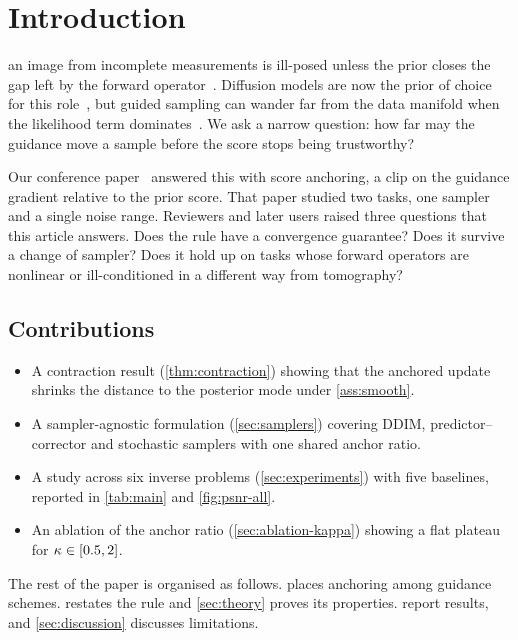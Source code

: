 \section{Introduction}
\label{sec:intro}
 an image from incomplete measurements is ill-posed unless the prior closes the gap left by the forward operator~\cite{okonkwo2021,lindqvist2022}. Diffusion models are now the prior of choice for this role~\cite{ho2020ddpm,song2021sde,dhariwal2021}, but guided sampling can wander far from the data manifold when the likelihood term dominates~\cite{morales2023,chung2023dps}. We ask a narrow question: how far may the guidance move a sample before the score stops being trustworthy?

Our conference paper~\cite{vantreight2025anchor} answered this with score anchoring, a clip on the guidance gradient relative to the prior score. That paper studied two tasks, one sampler and a single noise range. Reviewers and later users raised three questions that this article answers. Does the rule have a convergence guarantee? Does it survive a change of sampler? Does it hold up on tasks whose forward operators are nonlinear or ill-conditioned in a different way from tomography?

\subsection{Contributions}
\label{sec:contributions}
\begin{itemize}
  \item A contraction result (\cref{thm:contraction}) showing that the anchored update shrinks the distance to the posterior mode under \cref{ass:smooth}.
  \item A sampler-agnostic formulation (\cref{sec:samplers}) covering DDIM, predictor--corrector and stochastic samplers with one shared anchor ratio.
  \item A study across six inverse problems (\cref{sec:experiments}) with five baselines, reported in \cref{tab:main} and \cref{fig:psnr-all}.
  \item An ablation of the anchor ratio (\cref{sec:ablation-kappa}) showing a flat plateau for $\kappa \in [0.5, 2]$.
\end{itemize}

The rest of the paper is organised as follows.  places anchoring among guidance schemes.  restates the rule and \cref{sec:theory} proves its properties.  report results, and \cref{sec:discussion} discusses limitations.

